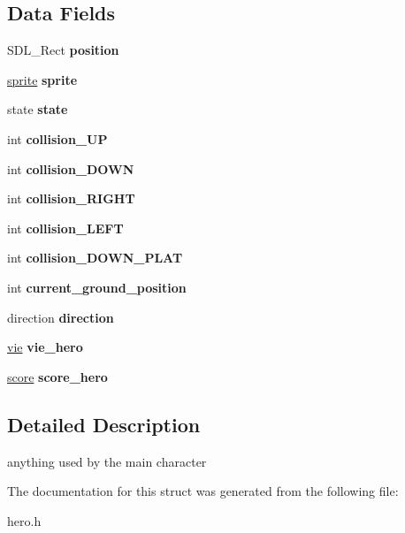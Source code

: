 \subsection*{Data Fields}
\begin{DoxyCompactItemize}
\item 
\mbox{\label{structHero_abc9595e897232ee4cf912e0e2c36bf28}} 
S\+D\+L\+\_\+\+Rect {\bfseries position}
\item 
\mbox{\label{structHero_a1f280d48754ed952298adf26a5f10c16}} 
\hyperlink{structSprite}{sprite} {\bfseries sprite}
\item 
\mbox{\label{structHero_af2abe9c576d42b2dffb36f2dc332d680}} 
state {\bfseries state}
\item 
\mbox{\label{structHero_aa111c732e587bf2bee3f58c4e3c7dba3}} 
int {\bfseries collision\+\_\+\+UP}
\item 
\mbox{\label{structHero_ab77a2aee8cecfbe25f95542179cfba65}} 
int {\bfseries collision\+\_\+\+D\+O\+WN}
\item 
\mbox{\label{structHero_af8d0fe553ca11082004c8fdab84780e4}} 
int {\bfseries collision\+\_\+\+R\+I\+G\+HT}
\item 
\mbox{\label{structHero_af7f5cea2cc6cc1a0a71c6406f5cb7eb0}} 
int {\bfseries collision\+\_\+\+L\+E\+FT}
\item 
\mbox{\label{structHero_ad0cda8d82f4351c33ac99403fad1ca52}} 
int {\bfseries collision\+\_\+\+D\+O\+W\+N\+\_\+\+P\+L\+AT}
\item 
\mbox{\label{structHero_a058a4906f1625db7ce2c1abcc4eca639}} 
int {\bfseries current\+\_\+ground\+\_\+position}
\item 
\mbox{\label{structHero_ac32ab152105eb5cda88226f29ee03daf}} 
direction {\bfseries direction}
\item 
\mbox{\label{structHero_ab523a8e24b06bab0cbc17cd744f772aa}} 
\hyperlink{structVie}{vie} {\bfseries vie\+\_\+hero}
\item 
\mbox{\label{structHero_af3b8a739baa871df683f7ce374fae8d3}} 
\hyperlink{structScore}{score} {\bfseries score\+\_\+hero}
\end{DoxyCompactItemize}


\subsection{Detailed Description}
anything used by the main character 

The documentation for this struct was generated from the following file\+:\begin{DoxyCompactItemize}
\item 
hero.\+h\end{DoxyCompactItemize}
